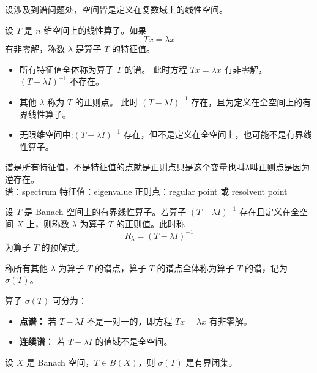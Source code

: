 \begin{definition}[有限维空间上的谱]
设涉及到谱问题处，空间皆是定义在复数域上的线性空间。

设 $T$ 是 $n$ 维空间上的线性算子。如果 
\[
Tx = \lambda x
\]
有非零解，称数 $\lambda$ 是算子 $T$ 的特征值。

\begin{itemize}
    \item 所有特征值全体称为算子 $T$ 的谱。
          此时方程 $Tx=\lambda x$ 有非零解，$(T-\lambda I)^{-1}$ 不存在。
    \item 其他 $\lambda$ 称为 $T$ 的正则点。
          此时 $(T-\lambda I)^{-1}$ 存在，且为定义在全空间上的有界线性算子。
    \item 无限维空间中:$(T-\lambda I)^{-1}$ 存在，但不是定义在全空间上，也可能不是有界线性算子。
\end{itemize}

\end{definition}






\begin{note}
  谱是所有特征值，不是特征值的点就是正则点只是这个变量也叫$\lambda  $叫正则点是因为逆存在。\\
  谱：spectrum 
  特征值：eigenvalue
  正则点：regular point 或 resolvent point
\end{note}
\begin{definition}[谱与正则值]
设 $T$ 是 Banach 空间上的有界线性算子。若算子 $(T - \lambda I)^{-1}$ 存在且定义在全空间 $X$ 上，则称数 $\lambda$ 为算子 $T$ 的正则值。此时称
\[
R_\lambda = (T - \lambda I)^{-1}
\]
为算子 $T$ 的预解式。

称所有其他 $\lambda$ 为算子 $T$ 的谱点，算子 $T$ 的谱点全体称为算子 $T$ 的谱，记为 $\sigma(T)$。
\end{definition}

\noindent 算子 $\sigma(T)$ 可分为：

\begin{itemize}
    \item \textbf{点谱：} 若 $T - \lambda I$ 不是一对一的，即方程 $Tx = \lambda x$ 有非零解。
    \item \textbf{连续谱：} 若 $T - \lambda I$ 的值域不是全空间。
\end{itemize}
\begin{theorem}[完备空间上的有界线性算子的谱是有界闭集]
设 $X$ 是 Banach 空间，$T \in B(X)$，则 $\sigma(T)$ 是有界闭集。
\end{theorem}


